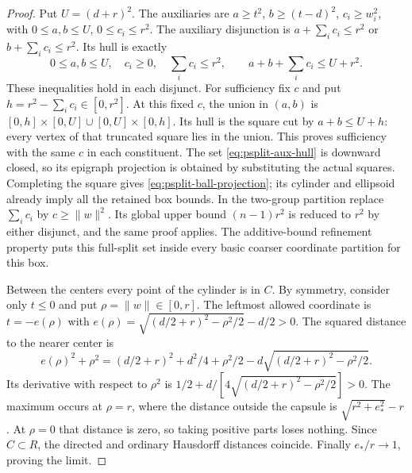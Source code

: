 \begin{proof}
Put $U=(d+r)^2$. The auxiliaries are $a\ge t^2$, $b\ge(t-d)^2$,
$c_i\ge w_i^2$, with $0\le a,b\le U$, $0\le c_i\le r^2$.
The auxiliary disjunction is $a+\sum_i c_i\le r^2$ or
$b+\sum_i c_i\le r^2$. Its hull is exactly
\begin{equation}\label{eq:psplit-aux-hull}
 0\le a,b\le U,\quad c_i\ge0,\quad\sum_i c_i\le r^2,
 \qquad a+b+\sum_i c_i\le U+r^2.
\end{equation}
These inequalities hold in each disjunct. For sufficiency fix $c$ and put
$h=r^2-\sum_i c_i\in[0,r^2]$. At this fixed $c$, the union in $(a,b)$
is $[0,h]\times[0,U]\cup[0,U]\times[0,h]$. Its hull is the square
cut by $a+b\le U+h$: every vertex of that truncated square lies in
the union. This proves sufficiency with the same $c$ in each constituent.
The set \eqref{eq:psplit-aux-hull} is downward closed, so its epigraph
projection is obtained by substituting the actual squares. Completing the
square gives \eqref{eq:psplit-ball-projection}; its cylinder and ellipsoid
already imply all the retained box bounds. In the two-group partition
replace $\sum_i c_i$ by $c\ge\|w\|^2$. Its global upper bound
$(n-1)r^2$ is reduced to $r^2$ by either disjunct, and the same proof
applies.
The additive-bound refinement property
\citep[Theorem 4 and Corollary 3]{KronqvistEtAl2026} puts this full-split
set inside every basic coarser coordinate partition for this box.

Between the centers every point of the cylinder is in $C$. By symmetry,
consider only $t\le0$ and put $\rho=\|w\|\in[0,r]$. The leftmost allowed
coordinate is $t=-e(\rho)$ with
$e(\rho)=\sqrt{(d/2+r)^2-\rho^2/2}-d/2>0$.
The squared distance to the nearer center is
\[
 e(\rho)^2+\rho^2=(d/2+r)^2+d^2/4+\rho^2/2
                         -d\sqrt{(d/2+r)^2-\rho^2/2}.
\]
Its derivative with respect to $\rho^2$ is
$1/2+d/[4\sqrt{(d/2+r)^2-\rho^2/2}]>0$. The maximum occurs at
$\rho=r$, where the distance outside the capsule is
$\sqrt{r^2+e_*^2}-r$. At $\rho=0$ that distance is zero, so taking
positive parts loses nothing. Since $C\subset R$, the directed and
ordinary Hausdorff distances coincide. Finally $e_*/r\to1$, proving the limit.
\end{proof}

